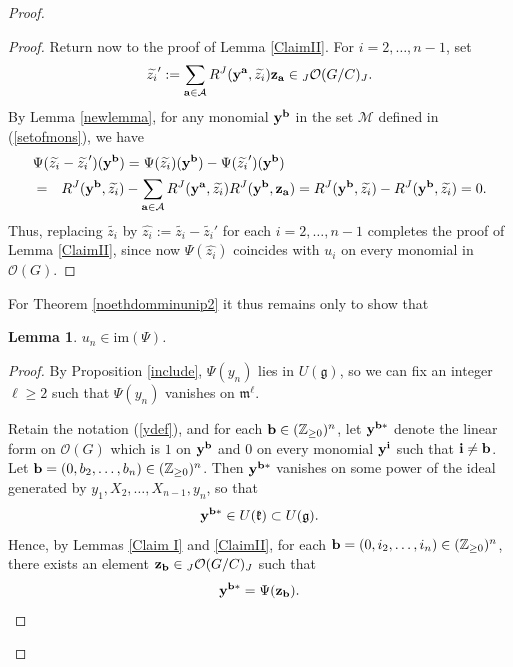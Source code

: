 \documentclass{amsart}
\numberwithin{equation}{section}
\newtheorem{lemma}[theorem]{Lemma}
\theoremstyle{definition}
\begin{document}
\begin{proof}
\begin{proof}
Return now to the proof of Lemma \ref{ClaimII}. For $i = 2, \ldots , n-1$, set 
$$\widetilde{z_i}':=\sum_{{\bf a}\in \mathcal{A}}R^J({\bf y}^{{\bf a}},\widetilde{z_i}){\bf z}_{{\bf a}}\in {}_J\mathcal{O}(G/C )_J.$$ 
By Lemma \ref{newlemma}, for any monomial ${\bf y}^{{\bf b}}$ in the set $\mathcal{M}$ defined in (\ref{setofmons}), we have
\begin{eqnarray*}
\lefteqn{\Psi(\widetilde{z_i}-\widetilde{z_i}')({\bf y}^{{\bf b}}) =\Psi(\widetilde{z_i})({\bf y}^{{\bf b}})-\Psi(\widetilde{z_i}')({\bf y}^{{\bf b}})}\\
& = &
R^J({\bf y}^{{\bf b}},\widetilde{z_i})-\sum_{{\bf a}\in \mathcal{A}}R^J({\bf y}^{{\bf a}},\widetilde{z_i})R^J({\bf y}^{{\bf b}},{\bf z}_{{\bf a}}) =R^J({\bf y}^{{\bf b}},\widetilde{z_i})- R^J({\bf y}^{{\bf b}},\widetilde{z_i})=0.
\end{eqnarray*}
Thus, replacing $\widetilde{z_i}$ by $\widehat{z_i} := \widetilde{z_i}-\widetilde{z_i}'$ for each $i = 2, \ldots , n-1$ completes the proof of Lemma \ref{ClaimII}, since now $\Psi (\widehat{z_i})$ coincides with $u_i$ on every monomial in $\mathcal{O}(G)$.
\end{proof}

For Theorem \ref{noethdomminunip2} it thus remains only to show that 

\begin{lemma}\label{Claim III}
$u_n \in \mathrm{im}(\Psi)$.
\end{lemma} 

\begin{proof}
By Proposition \ref{include}, $\Psi(y_n)$ lies in $U(\mathfrak{g})$, so we can fix an integer ${\ell}\ge 2$ such that $\Psi(y_n)$ vanishes on $\mathfrak{m}^{\ell}$.

Retain the notation (\ref{ydef}), and for each ${\bf b} \in (\mathbb{Z}_{\geq 0})^n$, let ${\bf y}^{{\bf b*}}$ denote the linear form on $\mathcal{O}(G)$ which is $1$ on ${\bf y}^{{\bf b}}$ and $0$ on every monomial ${\bf y}^{{\bf i}}$ such that ${\bf i}\ne {\bf b}$. Let ${\bf b}=(0,b_2,\dots,b_n) \in (\mathbb{Z}_{\geq 0})^n$. Then ${\bf y}^{{\bf b*}}$ vanishes on some power of the ideal generated by $y_1,X_2, \ldots,X_{n-1},y_n$, so that
\begin{equation}\label{contain}
{\bf y}^{{\bf b*}}\in U(\mathfrak{k})\subset U(\mathfrak{g}).
\end{equation}
Hence, by Lemmas \ref{Claim I} and \ref{ClaimII}, for each ${\bf b}=(0,i_2,\dots,i_n) \in (\mathbb{Z}_{\geq 0})^n$, there exists an element ${\bf z}_{{\bf b}}\in {}_J\mathcal{O}(G/C)_{J}$ such that 
\begin{equation}\label{shrew}{\bf y}^{{\bf b*}}=\Psi({\bf z}_{{\bf b}}).
\end{equation}


\end{proof}
\end{proof}
\end{document}
